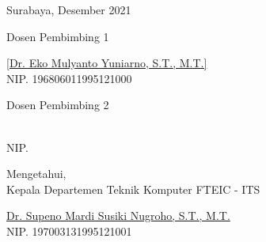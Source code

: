   \begin{flushright}
    Surabaya, Desember 2021
  \end{flushright}
  \vspace{1ex}
  
  \begin{center}
  
    \begin{multicols}{2}
  
      Dosen Pembimbing 1
      \vspace{12ex}
  
      \underline{[Dr. Eko Mulyanto Yuniarno, S.T., M.T.]} \\
      NIP. 196806011995121000
  
      \columnbreak
  
      Dosen Pembimbing 2
      \vspace{12ex}
  
      \underline{} \\
      NIP. 
  
    \end{multicols}
    \vspace{6ex}
  
    Mengetahui, \\
    Kepala Departemen Teknik Komputer FTEIC - ITS
    \vspace{12ex}
  
    \underline{Dr. Supeno Mardi Susiki Nugroho, S.T., M.T.} \\
    NIP. 197003131995121001
  
  \end{center}